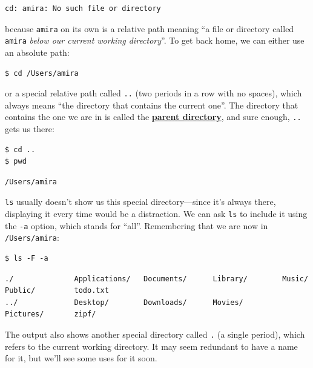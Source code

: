 \documentclass[
]{krantz}
\newcommand{\gref}[2]{\hyperlink{#2}{\textbf{#1}}}
\begin{document}
\begin{verbatim}
cd: amira: No such file or directory
\end{verbatim}

because \texttt{amira} on its own is a relative path meaning
``a file or directory called \texttt{amira} \emph{below our current working directory}''.
To get back home,
we can either use an absolute path:

\begin{verbatim}
$ cd /Users/amira
\end{verbatim}

or a special relative path called \texttt{..} (two periods in a row with no spaces),
which always means ``the directory that contains the current one''.
The directory that contains the one we are in is called the \gref{parent directory}{parent\_directory},
and sure enough,
\texttt{..} gets us there:

\begin{verbatim}
$ cd ..
$ pwd
\end{verbatim}

\begin{verbatim}
/Users/amira
\end{verbatim}

\texttt{ls} usually doesn't show us this special directory---since it's always there,
displaying it every time would be a distraction.
We can ask \texttt{ls} to include it using the \texttt{-a} option,
which stands for ``all''.
Remembering that we are now in \texttt{/Users/amira}:

\begin{verbatim}
$ ls -F -a
\end{verbatim}

\begin{verbatim}
./              Applications/   Documents/      Library/        Music/          Public/         todo.txt
../             Desktop/        Downloads/      Movies/         Pictures/       zipf/
\end{verbatim}

The output also shows another special directory called \texttt{.} (a single period),
which refers to the current working directory.
It may seem redundant to have a name for it,
but we'll see some uses for it soon.
\end{document}
